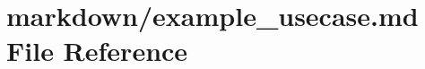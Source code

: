 \hypertarget{example__usecase_8md}{}\section{markdown/example\+\_\+usecase.md File Reference}
\label{example__usecase_8md}
